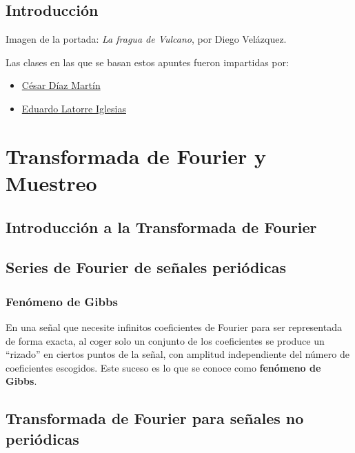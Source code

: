 \documentclass[a4paper,oneside]{book}
\begin{document}
\newpage
{}
{}
\section*{Introducción}
Imagen de la portada: \textsl{La fragua de Vulcano}, por Diego Velázquez.

Las clases en las que se basan estos apuntes fueron impartidas por:
\begin{itemize}
	\item  \href{mailto:cesar.diazm@upm.es}{César Díaz Martín}
	\item \href{mailto:eduardo.latorre.iglesias@upm.es}{Eduardo Latorre Iglesias}
\end{itemize}

\newpage

\setlength{\parskip}{0em}
\tableofcontents
\setlength{\parskip}{0.5em}


\chapter{Transformada de Fourier y Muestreo}

\section{Introducción a la Transformada de Fourier}

\section{Series de Fourier de señales periódicas}

\subsection{Fenómeno de Gibbs}

En una señal que necesite infinitos coeficientes de Fourier para ser representada de forma exacta, al coger solo un conjunto de los coeficientes se produce un ``rizado'' en ciertos puntos de la señal, con amplitud independiente del número de coeficientes escogidos. Este suceso es lo que se conoce como \textbf{fenómeno de Gibbs}.

\section{Transformada de Fourier para señales no periódicas}
\end{document}
